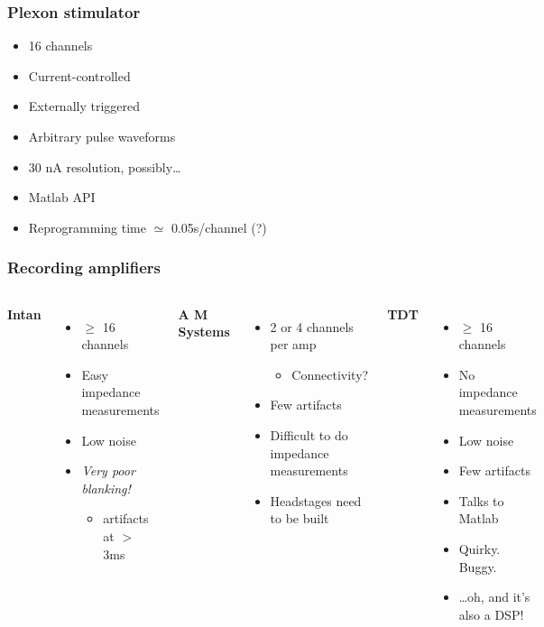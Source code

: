 \documentclass{beamer}
\begin{document}
\begin{frame}
  \frametitle{Plexon stimulator}
  \begin{itemize}
    \item 16 channels
    \item Current-controlled
    \item Externally triggered
    \item Arbitrary pulse waveforms
    \item 30 nA resolution, possibly\dots
    \item Matlab API
    \item Reprogramming time $\simeq$ 0.05s/channel (?)
  \end{itemize}
\end{frame}
    

\begin{frame}
  \frametitle{Recording amplifiers}
  \begin{columns}
    \column{33mm}
    {\bf Intan}
    \begin{itemize}
      \item $\geq$ 16 channels
      \item Easy impedance measurements
      \item Low noise
      \item {\em Very poor blanking!}
        \begin{itemize}
        \item artifacts at $>$ 3ms
        \end{itemize}
    \end{itemize}
    \column{36mm}
    {\bf A M Systems}
    \begin{itemize}
      \item 2 or 4 channels per amp
        \begin{itemize}
          \item Connectivity?
        \end{itemize}
      \item Few artifacts
      \item Difficult to do impedance measurements
      \item Headstages need to be built
    \end{itemize}
    \column{33mm}
    {\bf TDT}
    \begin{itemize}
      \item $\geq$ 16 channels
      \item No impedance measurements
      \item Low noise
      \item Few artifacts
      \item Talks to Matlab
      \item Quirky.  Buggy.
      \item \dots oh, and it's also a DSP!
    \end{itemize}
  \end{columns}
\end{frame}
\end{document}

